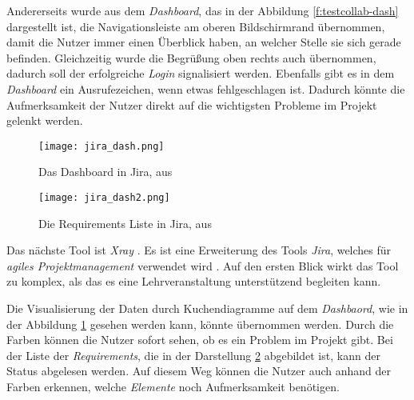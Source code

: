 \documentclass[11pt,a4paper]{report}
\begin{document}
Andererseits wurde aus dem \textit{Dashboard}, das in der Abbildung \ref{f:testcollab-dash} dargestellt ist, die Navigationsleiste am oberen Bildschirmrand übernommen, damit die Nutzer immer einen Überblick haben, an welcher Stelle sie sich gerade befinden. Gleichzeitig wurde die Begrüßung oben rechts auch übernommen, dadurch soll der erfolgreiche \textit{Login} signalisiert werden. Ebenfalls gibt es in dem \textit{Dashboard} ein Ausrufezeichen, wenn etwas fehlgeschlagen ist. Dadurch könnte die Aufmerksamkeit der Nutzer direkt auf die wichtigsten Probleme im Projekt gelenkt werden.

























\begin{figure}[htpb]
  \centering
  \texttt{[image: jira\_dash.png]}
  \caption{Das Dashboard in Jira, aus \cite{xray}}
  \label{f:jiradash}
\end{figure}


\begin{figure}[htpb]
  \centering
  \texttt{[image: jira\_dash2.png]}
  \caption{Die Requirements Liste in Jira, aus \cite{xray}}
  \label{f:jiradash2}
\end{figure}


Das nächste Tool ist \textit{Xray} \cite{xray}. Es ist eine Erweiterung des Tools \textit{Jira}, welches für \textit{agiles Projektmanagement} verwendet wird \cite{jiraxray}. Auf den ersten Blick wirkt das Tool zu komplex, als das es eine Lehrveranstaltung unterstützend begleiten kann.

Die Visualisierung der Daten durch Kuchendiagramme auf dem \textit{Dashbaord}, wie in der Abbildung \ref{f:jiradash} gesehen werden kann, könnte übernommen werden. Durch die Farben können die Nutzer sofort sehen, ob es ein Problem im Projekt gibt. Bei der Liste der \textit{Requirements}, die in der Darstellung \ref{f:jiradash2} abgebildet ist, kann der Status abgelesen werden. Auf diesem Weg können die Nutzer auch anhand der Farben erkennen, welche \textit{Elemente} noch Aufmerksamkeit benötigen.
\end{document}
